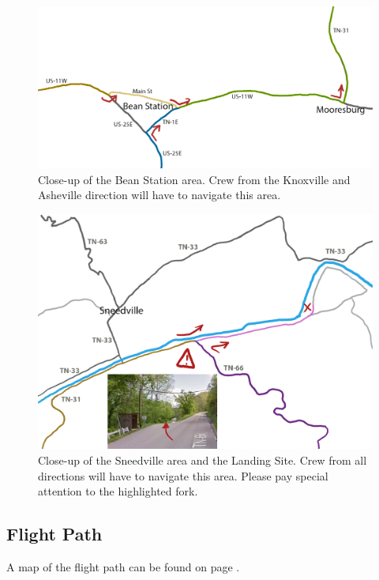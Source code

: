 \begin{figure}[H]
\centering
\includegraphics[width=.9\textwidth]{images/beanstationmap-highlighted.png}
\caption{Close-up of the Bean Station area. Crew from the Knoxville and Asheville direction will have to navigate this area.}
\label{image:beanstation}
\end{figure}
\vfill
\begin{figure}[H]
\centering
\includegraphics[width=.9\textwidth]{images/sneedville-closeup-highlighted.png}
\caption{Close-up of the Sneedville area and the Landing Site. Crew from all directions will have to navigate this area. Please pay special attention to the highlighted fork.}
\label{image:sneedville}
\end{figure}

\subsection*{Flight Path}
A map of the flight path can be found on page \pageref{image:overviewmap}.



